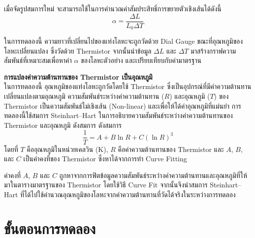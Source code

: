 \documentclass[11pt,a4paper]{article}
\begin{document}
เมื่อจัดรูปสมการใหม่ จะสามารถใช้ในการคำนวณค่าสัมประสิทธิ์การขยายตัวเชิงเส้นได้ดังนี้
\begin{equation}
    \alpha = \frac{\Delta L}{L_0 \Delta T} \label{alpha}
\end{equation}

ในการทดลองนี้ ความยาวที่เปลี่ยนไปของแท่งโลหะจะถูกวัดด้วย Dial Gauge ขณะที่อุณหภูมิของโลหะเปลี่ยนแปลง ซึ่งวัดด้วย Thermistor จากนั้นนำข้อมูล $\Delta L$ และ $\Delta T$ มาสร้างกราฟความสัมพันธ์ที่เหมาะสมเพื่อหาค่า $\alpha$ ของโลหะตัวอย่าง และเปรียบเทียบกับค่ามาตรฐาน

\bigskip
\noindent
\textbf{การแปลงค่าความต้านทานของ Thermistor เป็นอุณหภูมิ} \\

ในการทดลองนี้ อุณหภูมิของแท่งโลหะถูกวัดโดยใช้ Thermistor ซึ่งเป็นอุปกรณ์ที่มีค่าความต้านทานเปลี่ยนแปลงตามอุณหภูมิ ความสัมพันธ์ระหว่างค่าความต้านทาน ($R$) และอุณหภูมิ ($T$) ของ Thermistor เป็นความสัมพันธ์ไม่เชิงเส้น (Non-linear) และเพื่อให้ได้ค่าอุณหภูมิที่แม่นยำ การทดลองนี้ใช้สมการ Steinhart--Hart ในการอธิบายความสัมพันธ์ระหว่างค่าความต้านทานของ Thermistor และอุณหภูมิ ดังสมการ ดังสมการ \cite{SteinhartHart}
\begin{equation}
    \frac{1}{T} = A + B \ln R + C (\ln R)^3 \label{SH}
\end{equation}
โดยที่ $T$ คืออุณหภูมิในหน่วยเคลวิน ($\mathrm{K}$), $R$ คือค่าความต้านทานของ Thermistor และ $A$, $B$, และ $C$ เป็นค่าคงที่ของ Thermistor ซึ่งหาได้จากการทำ Curve Fitting

ค่าคงที่ $A$, $B$ และ $C$ ถูกหาจากการฟิตข้อมูลความสัมพันธ์ระหว่างค่าความต้านทานและอุณหภูมิที่ให้มาในตารางมาตรฐานของ Thermistor โดยใช้วิธี Curve Fit จากนั้นจึงนำสมการ Steinhart--Hart ที่ได้ไปใช้คำนวณอุณหภูมิของโลหะจากค่าความต้านทานที่วัดได้จริงในระหว่างการทดลอง





\section{ขั้นตอนการทดลอง} \label{procedure}
\end{document}
